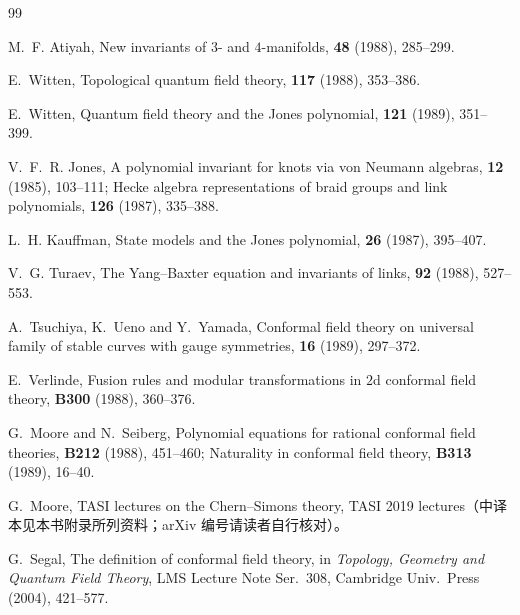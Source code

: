 \begin{thebibliography}{99}
\small

 M.~F. Atiyah,
\newblock New invariants of $3$- and $4$-manifolds,
 {\bf 48} (1988), 285--299.

 E.~Witten,
\newblock Topological quantum field theory,
 {\bf 117} (1988), 353--386.

 E.~Witten,
\newblock Quantum field theory and the Jones polynomial,
 {\bf 121} (1989), 351--399.

 V.~F.~R. Jones,
\newblock A polynomial invariant for knots via von Neumann algebras,
 {\bf 12} (1985), 103--111;
\newblock Hecke algebra representations of braid groups and link polynomials,
 {\bf 126} (1987), 335--388.

 L.~H. Kauffman,
\newblock State models and the Jones polynomial,
 {\bf 26} (1987), 395--407.

 V.~G. Turaev,
\newblock The Yang--Baxter equation and invariants of links,
 {\bf 92} (1988), 527--553.

 A.~Tsuchiya, K.~Ueno and Y.~Yamada,
\newblock Conformal field theory on universal family of stable curves with gauge symmetries,
 {\bf 16} (1989), 297--372.

 E.~Verlinde,
\newblock Fusion rules and modular transformations in $2$d conformal field theory,
 {\bf B300} (1988), 360--376.

 G.~Moore and N.~Seiberg,
\newblock Polynomial equations for rational conformal field theories,
 {\bf B212} (1988), 451--460;
\newblock Naturality in conformal field theory,
 {\bf B313} (1989), 16--40.

 G.~Moore,
\newblock TASI lectures on the Chern--Simons theory,
\newblock TASI 2019 lectures（中译本见本书附录所列资料；arXiv 编号请读者自行核对）。

 G.~Segal,
\newblock The definition of conformal field theory,
\newblock in {\it Topology, Geometry and Quantum Field Theory}, LMS Lecture Note Ser.\ 308,
Cambridge Univ.\ Press (2004), 421--577.


\end{thebibliography}
